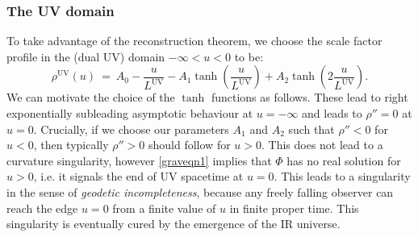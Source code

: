 \documentclass[prd,reprint,a4paper,showpacs,superscriptaddress,11pt,onecolumn,nofootinbib]{revtex4-1}
\renewcommand{\(}{\left(}
\renewcommand{\)}{\right)}
\newcommand{\6}{\partial}
\begin{document}
\subsubsection{The UV domain} 
To take advantage of the reconstruction theorem, we choose the scale factor profile in the (dual UV) domain $-\infty < u <0$ to be:
\begin{equation}\label{rhoUV}
\rho^{\text{UV}}\left(u\right) ~ = ~ A_0 - \dfrac{u}{L^{\text{UV}}} - A_1 \tanh\left( \dfrac{u}{L^{\text{UV}}}\right) + A_2 \tanh\left(2 \dfrac{u}{L^{\text{UV}}}\right). 
\end{equation}
We can motivate the choice of the $\tanh$ functions as follows. These lead to right exponentially subleading asymptotic behaviour at $u=-\infty$ and leads to $\rho'' = 0$ at $u= 0$. Crucially, if we choose our parameters $A_1$ and $A_2$ such that $\rho'' < 0$ for $u< 0$, then typically $\rho'' > 0$ should follow for $u > 0$. This does not lead to a curvature singularity, however \eqref{graveqn1} implies that $\Phi$ has no real solution for $u > 0$, i.e. it signals the end of UV spacetime at $u=0$. This leads to a singularity in the sense of \textit{geodetic incompleteness}, because any freely falling observer can reach the edge $u=0$ from a finite value of $u$ in finite proper time. This singularity is eventually cured by the emergence of the IR universe.
\end{document}
